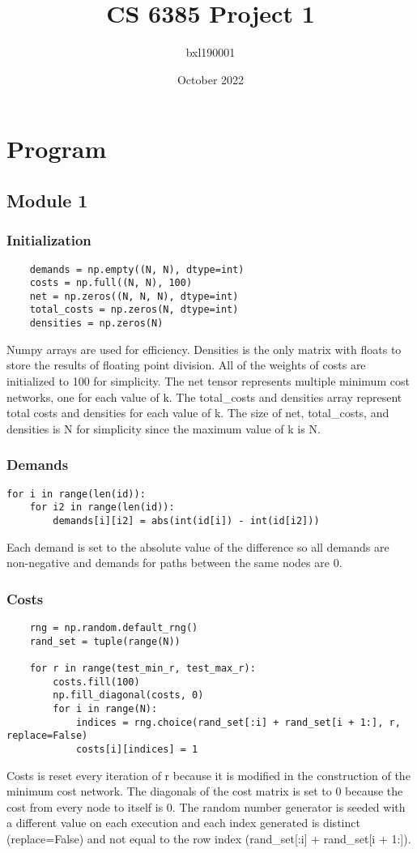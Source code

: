 \documentclass{article}
\title{CS 6385 Project 1}
\author{bxl190001 }
\date{October 2022}
\begin{document}
\maketitle
\section{Program}
\subsection{Module 1}
\subsubsection{Initialization}
\begin{verbatim}
    demands = np.empty((N, N), dtype=int)
    costs = np.full((N, N), 100)
    net = np.zeros((N, N, N), dtype=int)
    total_costs = np.zeros(N, dtype=int)
    densities = np.zeros(N)
\end{verbatim}
Numpy arrays are used for efficiency. Densities is the only matrix with floats to store the results of floating point division. All of the weights of costs are initialized to 100 for simplicity. The net tensor represents multiple minimum cost networks, one for each value of k. The total\_costs and densities array represent total costs and densities for each value of k. The size of net, total\_costs, and densities is N for simplicity since the maximum value of k is N.
    
\subsubsection{Demands}
\begin{verbatim}
for i in range(len(id)):
    for i2 in range(len(id)):
        demands[i][i2] = abs(int(id[i]) - int(id[i2]))
\end{verbatim}
Each demand is set to the absolute value of the difference so all demands are non-negative and demands for paths between the same nodes are 0.
            
\subsubsection{Costs}
\begin{verbatim}
    rng = np.random.default_rng()
    rand_set = tuple(range(N))
    
    for r in range(test_min_r, test_max_r):
        costs.fill(100)
        np.fill_diagonal(costs, 0)
        for i in range(N):
            indices = rng.choice(rand_set[:i] + rand_set[i + 1:], r, replace=False)
            costs[i][indices] = 1
\end{verbatim}
Costs is reset every iteration of r because it is modified in the construction of the minimum cost network. The diagonals of the cost matrix is set to 0 because the cost from every node to itself is 0. The random number generator is seeded with a different value on each execution and each index generated is distinct (replace=False) and not equal to the row index (rand\_set[:i] + rand\_set[i + 1:]).
\end{document}
